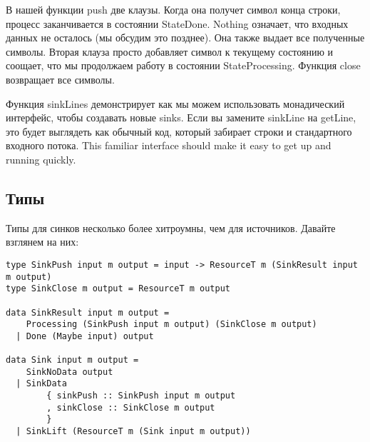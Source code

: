 В нашей функции push две клаузы. Когда она получет символ конца строки, процесс
заканчивается в состоянии StateDone. Nothing означает, что входных данных не
осталось (мы обсудим это позднее). Она также выдает все полученные символы. Вторая
клауза просто добавляет символ к текущему состоянию и соощает, что мы продолжаем работу
в состоянии StateProcessing. Функция close возвращает все символы.

Функция sinkLines демонстрирует как мы можем использовать монадический интерфейс,
чтобы создавать новые sinks. Если вы замените sinkLine на getLine, это будет выглядеть
как обычный код, который забирает строки и стандартного входного потока. This familiar
interface should make it easy to get up and running quickly.

\subsection{Типы}

Типы для синков несколько более хитроумны, чем для источников. Давайте взглянем на них:

\begin{lstlisting}
type SinkPush input m output = input -> ResourceT m (SinkResult input m output)
type SinkClose m output = ResourceT m output

data SinkResult input m output =
    Processing (SinkPush input m output) (SinkClose m output)
  | Done (Maybe input) output

data Sink input m output =
    SinkNoData output
  | SinkData
        { sinkPush :: SinkPush input m output
        , sinkClose :: SinkClose m output
        }
  | SinkLift (ResourceT m (Sink input m output))
\end{lstlisting}  
% 
% 
